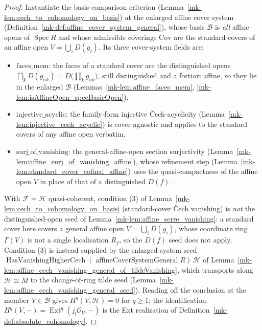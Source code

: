 \begin{proof}
  \leanok
    Instantiate the basis-comparison criterion (Lemma~\ref{mk-lem:cech_to_cohomology_on_basis}) at the
  enlarged affine cover system (Definition~\ref{mk-def:affine_cover_system_general}), whose basis
  \(\mathcal{B}\) is \emph{all} affine opens of \(\operatorname{Spec} R\) and whose admissible coverings
  \(\mathrm{Cov}\) are the standard covers of an affine open \(V = \bigcup_i D(g_i)\). Its three
  cover-system fields are:
  \begin{itemize}
    \item \(\mathrm{faces\_mem}\): the faces of a standard cover are the distinguished opens
      \(\bigcap_k D(g_{\sigma k}) = D\bigl(\prod_k g_{\sigma k}\bigr)\), still distinguished and a
      fortiori affine, so they lie in the enlarged \(\mathcal{B}\) (Lemmas~\ref{mk-lem:affine_faces_mem},
      \ref{mk-lem:isAffineOpen_specBasicOpen}).
    \item \(\mathrm{injective\_acyclic}\): the family-form injective {\v C}ech-acyclicity
      (Lemma~\ref{mk-lem:injective_cech_acyclic}) is cover-agnostic and applies to the standard covers of
      any affine open verbatim.
    \item \(\mathrm{surj\_of\_vanishing}\): the general-affine-open section surjectivity
      (Lemma~\ref{mk-lem:affine_surj_of_vanishing_affine}), whose refinement step
      (Lemma~\ref{mk-lem:standard_cover_cofinal_affine}) uses the quasi-compactness of the affine open
      \(V\) in place of that of a distinguished \(D(f)\).
  \end{itemize}
  With \(\mathcal{F} = \mathcal{H}\) quasi-coherent, condition (3) of
  Lemma~\ref{mk-lem:cech_to_cohomology_on_basis} (standard-cover {\v C}ech vanishing) is \emph{not} the
  distinguished-open seed of Lemma~\ref{mk-lem:affine_serre_vanishing}: a standard cover here covers a
  general affine open \(V = \bigcup_i D(g_i)\), whose coordinate ring \(\Gamma(V)\) is not a single
  localisation \(R_f\), so the \(D(f)\) seed does not apply. Condition (3) is instead supplied by the
  enlarged-system seed \(\operatorname{HasVanishingHigherCech}(\operatorname{affineCoverSystemGeneral}
  R)\, \mathcal{H}\) of Lemma~\ref{mk-lem:affine_cech_vanishing_general_of_tildeVanishing}, which transports
  along \(\mathcal{H} \cong \widetilde{M}\) to the change-of-ring tilde seed
  (Lemma~\ref{mk-lem:affine_cech_vanishing_general_seed}). Reading off the conclusion at the member
  \(V \in \mathcal{B}\) gives \(H^q(V, \mathcal{H}) = 0\) for \(q \geq 1\); the identification
  \(H^q(V, -) = \operatorname{Ext}^q(j_!\mathcal{O}_V, -)\) is the Ext realization of
  Definition~\ref{mk-def:absolute_cohomology}.
\end{proof}

